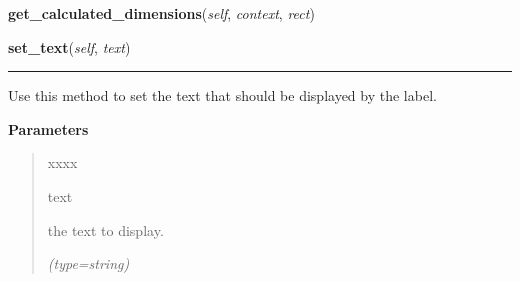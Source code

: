     \vspace{0.5ex}

\hspace{.8\funcindent}\begin{boxedminipage}{\funcwidth}

    \raggedright \textbf{get\_calculated\_dimensions}(\textit{self}, \textit{context}, \textit{rect})

\setlength{\parskip}{2ex}
\setlength{\parskip}{1ex}
    \end{boxedminipage}

    \label{pygtk_chart:label:Label:set_text}

    \vspace{0.5ex}

\hspace{.8\funcindent}\begin{boxedminipage}{\funcwidth}

    \raggedright \textbf{set\_text}(\textit{self}, \textit{text})

    \vspace{-1.5ex}

    \rule{\textwidth}{0.5\fboxrule}
\setlength{\parskip}{2ex}
    Use this method to set the text that should be displayed by the label.

\setlength{\parskip}{1ex}
      \textbf{Parameters}
      \vspace{-1ex}

      \begin{quote}
        \begin{Ventry}{xxxx}

          \item[text]

          the text to display.

            {\it (type=string)}

        \end{Ventry}

      \end{quote}

    \end{boxedminipage}

    \label{pygtk_chart:label:Label:get_text}

